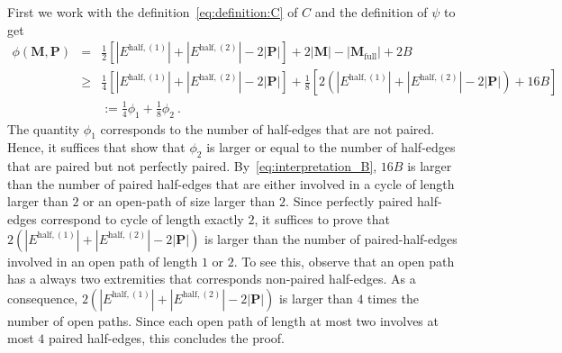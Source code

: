 \documentclass{article}
\begin{document}
First we work with the definition~\eqref{eq:definition:C} of $C$ and the definition of $\psi$ to get 
\begin{eqnarray*}
    \phi(\mathbf{M},\mathbf{P})&=&   \frac{1}{2}\left[|E^{\mathrm{half},(1)}| + |E^{\mathrm{half},(2)}| - 2|\mathbf{P}|\right] + 2|\mathbf{M}|-|\mathbf{M}_{\mathrm{full}}|+ 2B \\
    &\geq & \frac{1}{4}\left[|E^{\mathrm{half},(1)}| + |E^{\mathrm{half},(2)}| - 2|\mathbf{P}|\right]+ \frac{1}{8}\left[ 2(|E^{\mathrm{half},(1)}| + |E^{\mathrm{half},(2)}| - 2|\mathbf{P}|)+16B\right]\\
    & &  :=\frac{1}{4} \phi_1 + \frac{1}{8}\phi_2\ .
\end{eqnarray*}
The quantity $\phi_1$ corresponds to the number of half-edges that are not paired. Hence, it suffices that show that $\phi_2$ is larger or equal to the number of half-edges that are paired but not perfectly paired. By~\eqref{eq:interpretation_B}, $16B$ is larger than the number of paired half-edges that are either involved in a cycle of length larger than $2$ or an open-path of size larger than $2$. Since perfectly paired half-edges correspond to cycle of length exactly $2$, it suffices to prove that $2(|E^{\mathrm{half},(1)}| + |E^{\mathrm{half},(2)}| - 2|\mathbf{P}|)$ is larger than the number of paired-half-edges involved in an open path of length $1$ or $2$. To see this, observe that an open path has a always two extremities that corresponds non-paired half-edges. As a consequence, $2(|E^{\mathrm{half},(1)}| + |E^{\mathrm{half},(2)}| - 2|\mathbf{P}|)$ is larger than $4$ times the number of open paths. Since each open path of length at most two involves at most $4$ paired half-edges, this concludes the proof. 









        
\end{document}
